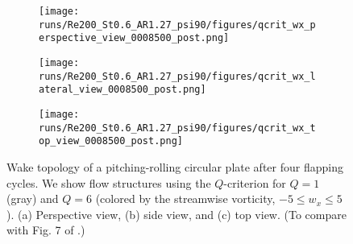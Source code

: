 \begin{figure}
  \centering
  \begin{minipage}{0.55\linewidth}
    \begin{subfigure}[t]{\linewidth}
      \texttt{[image: runs/Re200\_St0.6\_AR1.27\_psi90/figures/qcrit\_wx\_perspective\_view\_0008500\_post.png]}
      \caption{}
      \label{fig:baseline_wake_topology:perspective}
    \end{subfigure}
  \end{minipage}
  \begin{minipage}{0.35\linewidth}
    \begin{subfigure}[t]{\linewidth}
      \texttt{[image: runs/Re200\_St0.6\_AR1.27\_psi90/figures/qcrit\_wx\_lateral\_view\_0008500\_post.png]}
      \caption{}
      \label{fig:baseline_wake_topology:lateral}
    \end{subfigure}
    \vspace{1cm}
    \begin{subfigure}[b]{\linewidth}
      \texttt{[image: runs/Re200\_St0.6\_AR1.27\_psi90/figures/qcrit\_wx\_top\_view\_0008500\_post.png]}
      \caption{}
      \label{fig:baseline_wake_topology:top}
    \end{subfigure}
  \end{minipage}
  \caption{Wake topology of a pitching-rolling circular plate after four flapping cycles. We show flow structures  using the $Q$-criterion for $Q = 1$ (gray) and $Q = 6$ (colored by the streamwise vorticity, $-5 \leq w_x \leq 5$). (a) Perspective view, (b) side view, and (c) top view. (To compare with Fig. 7 of \citet{li_dong_2016}.)}
  \label{fig:baseline_wake_topology}
\end{figure}

